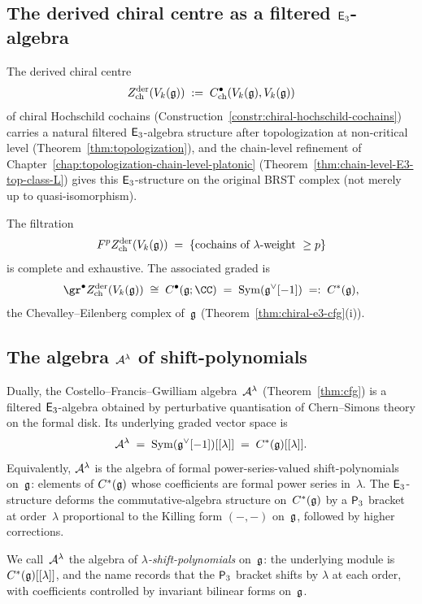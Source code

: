 \subsection{The derived chiral centre as a filtered
\texorpdfstring{$\mathsf{E}_3$}{E3}-algebra}

The derived chiral centre
\[
 Z^{\mathrm{der}}_{\mathrm{ch}}(V_k(\mathfrak{g}))
 \;:=\;
 C^\bullet_{\mathrm{ch}}(V_k(\mathfrak{g}), V_k(\mathfrak{g}))
\]
of chiral Hochschild cochains
(Construction~\ref{constr:chiral-hochschild-cochains}) carries
a natural filtered $\mathsf{E}_3$-algebra structure after
topologization at non-critical level
(Theorem~\ref{thm:topologization}), and the chain-level refinement of
Chapter~\ref{chap:topologization-chain-level-platonic}
(Theorem~\ref{thm:chain-level-E3-top-class-L}) gives this
$\mathsf{E}_3$-structure on the original BRST complex (not merely up
to quasi-isomorphism).

The filtration
\[
 F^p Z^{\mathrm{der}}_{\mathrm{ch}}(V_k(\mathfrak{g}))
 \;=\;
 \{\text{cochains of $\lambda$-weight } \geq p\}
\]
is complete and exhaustive. The associated graded is
\[
 \gr^\bullet Z^{\mathrm{der}}_{\mathrm{ch}}(V_k(\fg))
 \;\cong\;
 C^\bullet(\fg; \CC)
 \;=\;
 \Sym(\fg^\vee[-1])
 \;=:\;
 C^*(\fg),
\]
the Chevalley--Eilenberg complex of~$\mathfrak{g}$
(Theorem~\ref{thm:chiral-e3-cfg}(i)).

\subsection{The algebra \texorpdfstring{$\mathcal{A}^\lambda$}{A lambda}
of shift-polynomials}

Dually, the Costello--Francis--Gwilliam
algebra~$\mathcal{A}^\lambda$ (Theorem~\ref{thm:cfg}) is a filtered
$\mathsf{E}_3$-algebra obtained by perturbative quantisation of
Chern--Simons theory on the formal disk. Its underlying
graded vector space is
\[
 \mathcal{A}^\lambda
 \;=\;
 \operatorname{Sym}(\mathfrak{g}^\vee[-1])[[\lambda]]
 \;=\;
 C^*(\mathfrak{g})[[\lambda]].
\]
Equivalently, $\mathcal{A}^\lambda$ is the algebra of formal
power-series-valued shift-polynomials on~$\mathfrak{g}$: elements of
$C^*(\mathfrak{g})$ whose coefficients are formal power series
in~$\lambda$. The $\mathsf{E}_3$-structure deforms the
commutative-algebra structure on~$C^*(\mathfrak{g})$ by a $\mathsf{P}_3$
bracket at order~$\lambda$ proportional to the Killing form
$(-,-)$ on~$\mathfrak{g}$, followed by higher corrections.

\begin{notation}
\label{not:shift-polynomial}
We call~$\mathcal{A}^\lambda$ the algebra of
\emph{$\lambda$-shift-polynomials} on~$\mathfrak{g}$: the underlying
module is $C^*(\mathfrak{g})[[\lambda]]$, and the name records that the
$\mathsf{P}_3$ bracket shifts by $\lambda$ at each order, with
coefficients controlled by invariant bilinear forms on~$\mathfrak{g}$.
\end{notation}


